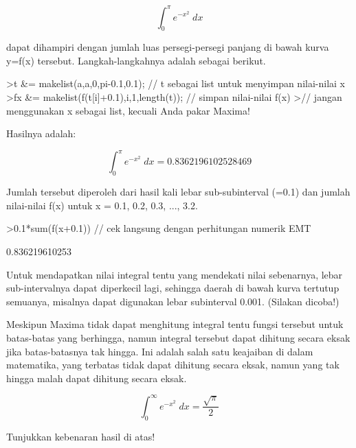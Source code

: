 \documentclass{article}
\begin{document}
\begin{eulernotebook}
\begin{eulercomment}
\begin{eulercomment}
\begin{eulercomment}
\begin{eulercomment}
\begin{eulercomment}
\begin{eulercomment}
\begin{eulercomment}
\end{eulercomment}
\begin{eulerformula}
\[
\int_{0}^{\pi}{e^ {- x^2 }\;dx}
\]
\end{eulerformula}
\begin{eulercomment}
dapat dihampiri dengan jumlah luas persegi-persegi panjang di bawah
kurva y=f(x) tersebut. Langkah-langkahnya adalah sebagai berikut.
\end{eulercomment}
\begin{eulerprompt}
>t &= makelist(a,a,0,pi-0.1,0.1); // t sebagai list untuk menyimpan nilai-nilai x
>fx &= makelist(f(t[i]+0.1),i,1,length(t)); // simpan nilai-nilai f(x)
>// jangan menggunakan x sebagai list, kecuali Anda pakar Maxima!
\end{eulerprompt}
\begin{eulercomment}
Hasilnya adalah:

\end{eulercomment}
\begin{eulerformula}
\[
\int_{0}^{\pi}{e^ {- x^2 }\;dx}=0.8362196102528469
\]
\end{eulerformula}
\begin{eulercomment}
Jumlah tersebut diperoleh dari hasil kali lebar sub-subinterval (=0.1)
dan jumlah nilai-nilai f(x) untuk x = 0.1, 0.2, 0.3, ..., 3.2.
\end{eulercomment}
\begin{eulerprompt}
>0.1*sum(f(x+0.1)) // cek langsung dengan perhitungan numerik EMT
\end{eulerprompt}
\begin{euleroutput}
  0.836219610253
\end{euleroutput}
\begin{eulercomment}
Untuk mendapatkan nilai integral tentu yang mendekati nilai
sebenarnya, lebar sub-intervalnya dapat diperkecil lagi, sehingga
daerah di bawah kurva tertutup semuanya, misalnya dapat digunakan
lebar subinterval 0.001. (Silakan dicoba!)

Meskipun Maxima tidak dapat menghitung integral tentu fungsi tersebut
untuk batas-batas yang berhingga, namun integral tersebut dapat
dihitung secara eksak jika batas-batasnya tak hingga. Ini adalah salah
satu keajaiban di dalam matematika, yang terbatas tidak dapat dihitung
secara eksak, namun yang tak hingga malah dapat dihitung secara eksak.
\end{eulercomment}
\begin{eulerformula}
\[
\int_{0}^{\infty }{e^ {- x^2 }\;dx}=\frac{\sqrt{\pi}}{2}
\]
\end{eulerformula}
\begin{eulercomment}
Tunjukkan kebenaran hasil di atas!


\end{eulercomment}
\end{eulercomment}
\end{eulercomment}
\end{eulercomment}
\end{eulercomment}
\end{eulercomment}
\end{eulercomment}
\end{eulernotebook}
\end{document}
